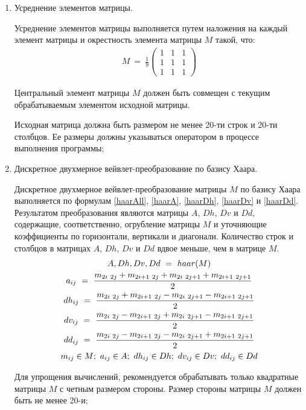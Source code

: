 \begin{enumerate}
	\item Усреднение элементов матрицы.

		Усреднение элементов матрицы выполняется путем наложения на каждый элемент матрицы и окрестность элемента матрицы $M$ такой, что:
		\begin{gather*}
			M ~=~ \frac{1}{9}
				\begin{pmatrix}
					1 & 1 & 1 \\ 
					1 & 1 & 1 \\ 
					1 & 1 & 1
				\end{pmatrix}
		\end{gather*}

		Центральный элемент матрицы $M$ должен быть совмещен с текущим обрабатываемым элементом исходной матрицы.

		Исходная матрица должна быть размером не менее 20-ти строк и 20-ти столбцов. Ее размеры должны указываться оператором в процессе выполнения программы;

	\item Дискретное двухмерное вейвлет-преобразование по базису Хаара.

		Дискретное двухмерное вейвлет-преобразование матрицы $M$ по базису Хаара выполняется по формулам \eqref{haarAll}, \eqref{haarA}, \eqref{haarDh}, \eqref{haarDv} и \eqref{haarDd}. Результатом преобразования являются матрицы $A$, $Dh$, $Dv$ и $Dd$, содержащие, соответственно, огрубление матрицы $M$ и уточняющие коэффициенты по горизонтали, вертикали и диагонали. Количество строк и столбцов в матрицах $A$, $Dh$, $Dv$ и $Dd$ вдвое меньше, чем в матрице $M$.
		\begin{gather}
			A, Dh, Dv, Dd ~=~ haar(M) \label{haarAll} \\
			a_{ij} ~=~ \frac{m_{2i~2j} + m_{2i + 1 ~ 2j} + m_{2i ~ 2j + 1} + m_{2i + 1 ~ 2j + 1}}{2} \label{haarA} \\
			dh_{ij} ~=~ \frac{m_{2i~2j} + m_{2i + 1 ~ 2j} - m_{2i ~ 2j + 1} - m_{2i + 1 ~ 2j + 1}}{2} \label{haarDh} \\
			dv_{ij} ~=~ \frac{m_{2i~2j} - m_{2i + 1 ~ 2j} + m_{2i ~ 2j + 1} - m_{2i + 1 ~ 2j + 1}}{2} \label{haarDv} \\
			dd_{ij} ~=~ \frac{m_{2i~2j} - m_{2i + 1 ~ 2j} - m_{2i ~ 2j + 1} + m_{2i + 1 ~ 2j + 1}}{2} \label{haarDd} \\
			m_{ij} \in M; ~ a_{ij} \in A; ~ dh_{ij} \in Dh; ~ dv_{ij} \in Dv; ~ dd_{ij} \in Dd \notag
		\end{gather}

		Для упрощения вычислений, рекомендуется обрабатывать только квадратные матрицы $M$ с четным размером стороны. Размер стороны матрицы $M$ должен быть не менее 20-и;


\end{enumerate}

